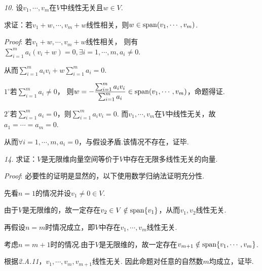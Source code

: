 \textit{10.}
设\(v_1,\cdots,v_m\)在\(V\)中线性无关且\(w\in V\).

求证：若\(v_1+w,\cdots,v_m+w\)线性相关，则\(w\in \mathrm{span} (v_1,\cdots,v_m)\).

\textit{Proof}:
若\(v_1+w,\cdots,v_m+w\)线性相关，
则有\(\sum_{i=1}^m a_i(v_i+w)=0,\exists i=1,\cdots,m,a_i\ne 0\).

从而\(\sum_{i=1}^m a_iv_i+w\sum_{i=1}^m a_i=0\).

\(1^{\circ}\)若\(\sum_{i=1}^m a_i\ne 0\)，
则\(w=-\dfrac{\sum_{i=1}^m a_iv_i}{\sum_{i=1}^m a_i}\in \mathrm{span} (v_1,\cdots,v_m)\)，命题得证.

\(2^{\circ}\)若\(\sum_{i=1}^m a_i=0\)，则\(\sum_{i=1}^m a_iv_i=0\).
而\(v_1,\cdots,v_m\)在\(V\)中线性无关，故\(a_1=\cdots=a_m=0\).

从而\(\forall i=1,\cdots,m, a_i=0\)，与假设矛盾.该情况不存在，证毕.

\hspace*{\fill}

\textit{14.}
求证：\(V\)是无限维向量空间等价于\(V\)中存在无限多线性无关的向量.

\textit{Proof}:
必要性的证明是显然的，以下使用数学归纳法证明充分性.

先看\(n=1\)的情况并设\(v_1 \ne 0 \in V\).

由于\(V\)是无限维的，故一定存在\(v_2 \in V \notin \mathrm{span} \{v_1\}\)，从而\(v_1,v_2\)线性无关.

再假设\(n=m\)时情况成立，即\(V\)中存在\(v_1,\cdots,v_m\)线性无关.

考虑\(n=m+1\)时的情况.由于\(V\)是无限维的，故一定存在\(v_{m+1} \notin \mathrm{span} \{v_1,\cdots,v_m\}\).

根据\textit{2.A.11}，\(v_1,\cdots,v_m,v_{m+1}\)线性无关.
因此命题对任意的自然数\(m\)均成立，证毕.

